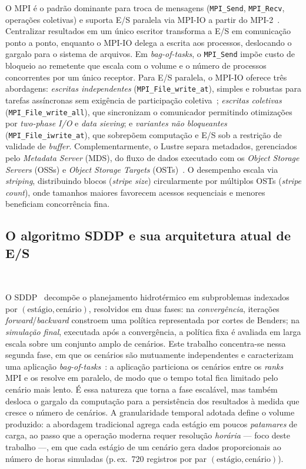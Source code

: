 \documentclass[12pt]{article}
\begin{document}
O MPI é o padrão dominante para troca de mensagens (\texttt{MPI\_Send}, \texttt{MPI\_Recv}, operações coletivas) e suporta E/S paralela via MPI-IO a partir do MPI-2~\cite{mpiCite,mpiioCite}. Centralizar resultados em um único escritor transforma a E/S em comunicação ponto a ponto, enquanto o MPI-IO delega a escrita aos processos, deslocando o gargalo para o sistema de arquivos. Em \textit{bag-of-tasks}, o \texttt{MPI\_Send} impõe custo de bloqueio ao remetente que escala com o volume e o número de processos concorrentes por um único receptor. Para E/S paralela, o MPI-IO oferece três abordagens: \emph{escritas independentes} (\texttt{MPI\_File\_write\_at}), simples e robustas para tarefas assíncronas sem exigência de participação coletiva~\cite{Cirne:2003}; \emph{escritas coletivas} (\texttt{MPI\_File\_write\_all}), que sincronizam o comunicador permitindo otimizações por \textit{two-phase I/O} e \textit{data sieving}; e \emph{variantes não bloqueantes} (\texttt{MPI\_File\_iwrite\_at}), que sobrepõem computação e E/S sob a restrição de validade de \textit{buffer}. Complementarmente, o Lustre separa metadados, gerenciados pelo \textit{Metadata Server} (MDS), do fluxo de dados executado com os \textit{Object Storage Servers} (OSSs) e \textit{Object Storage Targets} (OSTs)~\cite{Pjb:02,LustreManual}. O desempenho escala via \textit{striping}, distribuindo blocos (\textit{stripe size}) circularmente por múltiplos OSTs (\textit{stripe count}), onde tamanhos maiores favorecem acessos sequenciais e menores beneficiam concorrência fina.

\subsection{O algoritmo SDDP e sua arquitetura atual de E/S}~\label{sec:sddp}

O SDDP~\cite{MvLm:91} decompõe o planejamento hidrotérmico em subproblemas indexados por $(\text{estágio}, \text{cenário})$, resolvidos em duas fases: na \emph{convergência}, iterações \textit{forward}/\textit{backward} constroem uma política representada por cortes de Benders; na \emph{simulação final}, executada após a convergência, a política fixa é avaliada em larga escala sobre um conjunto amplo de cenários. Este trabalho concentra-se nessa segunda fase, em que os cenários são mutuamente independentes e caracterizam uma aplicação \textit{bag-of-tasks}~\cite{Cirne:2003}: a aplicação particiona os cenários entre os \textit{ranks} MPI e os resolve em paralelo, de modo que o tempo total fica limitado pelo cenário mais lento. É essa natureza que torna a fase escalável, mas também desloca o gargalo da computação para a persistência dos resultados à medida que cresce o número de cenários. A granularidade temporal adotada define o volume produzido: a abordagem tradicional agrega cada estágio em poucos \textit{patamares} de carga, ao passo que a operação moderna requer resolução \emph{horária} --- foco deste trabalho ---, em que cada estágio de um cenário gera dados proporcionais ao número de horas simuladas (p.\,ex.\ 720 registros por par $(\text{estágio}, \text{cenário})$).
\end{document}
